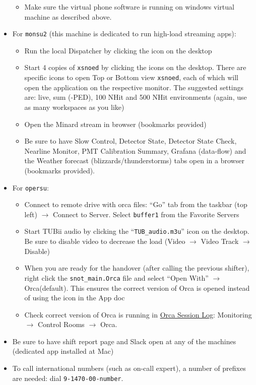 \documentclass[12pt, oneside, a4paper]{article}
\begin{document}
\begin{itemize}
\begin{itemize}
		\item Make sure the virtual phone software is running on windows virtual machine as described above.
	\end{itemize}
	\item For {\tt monsu2} (this machine is dedicated to run high-load streaming apps):
	\begin{itemize}
		\item Run the local Dispatcher by clicking the icon on the desktop
		\item Start 4 copies of {\tt xsnoed} by clicking the icons on the desktop. There are specific icons to open Top or Bottom view {\tt xsnoed}, each of which will open the application on the respective monitor. The suggested settings are: live, sum (-PED), 100 NHit and 500 NHit environments (again, use as many workspaces as you like)
		\item Open the Minard stream in browser (bookmarks provided)
		\item Be sure to have Slow Control, Detector State, Detector State Check, Nearline Monitor, PMT Calibration Summary, Grafana (data-flow) and the Weather forecast (blizzards/thunderstorms) tabs open in a browser (bookmarks provided).

	\end{itemize}
\item For {\tt opersu}:
	\begin{itemize}
		\item Connect to remote drive with orca files: ``Go'' tab from the taskbar (top left) $\rightarrow$ Connect to Server. Select {\tt buffer1} from the Favorite Servers
		\item Start TUBii audio by clicking the ``{\tt TUB\_audio.m3u}'' icon on the desktop. Be sure to disable video to decrease the load (Video $\rightarrow$ Video Track $\rightarrow$ Disable)
		\item When you are ready for the handover (after calling the previous shifter), right click the {\tt snot\_main.Orca} file and select ``Open With'' $\rightarrow$ Orca(default). This ensures the correct version of Orca is opened instead of using the icon in the App doc
		\item Check correct version of Orca is running in \href{https://snopl.us/monitoring/orca-session-logs}{Orca Session Log}: Monitoring $\rightarrow$ Control Rooms $\rightarrow$ Orca.
	\end{itemize}
\item Be sure to have shift report page and Slack open at any of the machines (dedicated app installed at Mac)
\item To call international numbers (such as on-call expert), a number of prefixes are needed: dial {\tt 9-1470-00-number}.
\end{itemize}
\end{document}
